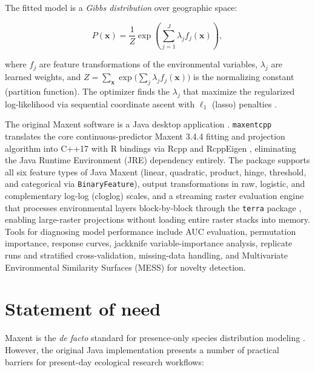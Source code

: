 \documentclass[10pt,letterpaper]{article}
\begin{document}
The fitted model is a \emph{Gibbs distribution} over geographic space:

\[
P(\mathbf{x}) = \frac{1}{Z}\exp\!\left(\sum_{j=1}^{J} \lambda_j f_j(\mathbf{x})\right),
\]

where \(f_j\) are feature transformations of the environmental
variables, \(\lambda_j\) are learned weights, and
\(Z = \sum_{\mathbf{x}}\exp\!\bigl(\sum_j \lambda_j f_j(\mathbf{x})\bigr)\)
is the normalizing constant (partition function). The optimizer finds
the \(\lambda_j\) that maximize the regularized log-likelihood via
sequential coordinate ascent with \(\ell_1\) (lasso) penalties
\cite{Phillips2006,Elith2011}.

The original Maxent software is a Java desktop application
\cite{Phillips2017}. \texttt{maxentcpp} translates the core
continuous-predictor Maxent 3.4.4 fitting and projection algorithm into
C++17 with R bindings via Rcpp \cite{Eddelbuettel2011} and RcppEigen
\cite{Bates2013}, eliminating the Java Runtime Environment (JRE)
dependency entirely. The package supports all six feature types of Java
Maxent (linear, quadratic, product, hinge, threshold, and categorical
via \texttt{BinaryFeature}), output transformations in raw, logistic,
and complementary log-log (cloglog) scales, and a streaming raster
evaluation engine that processes environmental layers block-by-block
through the \texttt{terra} package \cite{Hijmans2024}, enabling
large-raster projections without loading entire raster stacks into
memory. Tools for diagnosing model performance include AUC evaluation,
permutation importance, response curves, jackknife variable-importance
analysis, replicate runs and stratified cross-validation, missing-data
handling, and Multivariate Environmental Similarity Surfaces (MESS)
\cite{Elith2010} for novelty detection.

\section*{Statement of need}

Maxent is the \emph{de facto} standard for presence-only species
distribution modeling \cite{Merow2013}. However, the original Java
implementation presents a number of practical barriers for present-day
ecological research workflows:
\end{document}
